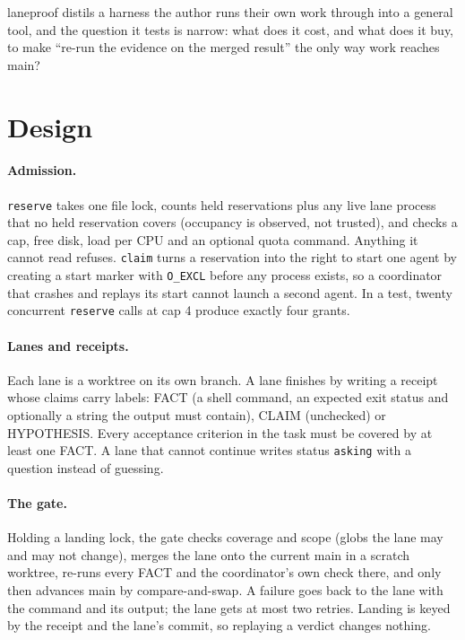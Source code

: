 \documentclass[11pt]{article}
\begin{document}
laneproof distils a harness the author runs their own work through into a general tool, and the question it tests is
narrow: what does it cost, and what does it buy, to make ``re-run the evidence on the merged result'' the only way
work reaches main?

\section{Design}
\paragraph{Admission.} \texttt{reserve} takes one file lock, counts held reservations plus any live lane process that
no held reservation covers (occupancy is observed, not trusted), and checks a cap, free disk, load per CPU and an
optional quota command. Anything it cannot read refuses. \texttt{claim} turns a reservation into the right to start
one agent by creating a start marker with \texttt{O\_EXCL} before any process exists, so a coordinator that crashes
and replays its start cannot launch a second agent. In a test, twenty concurrent \texttt{reserve} calls at cap 4
produce exactly four grants.

\paragraph{Lanes and receipts.} Each lane is a worktree on its own branch. A lane finishes by writing a receipt whose
claims carry labels: FACT (a shell command, an expected exit status and optionally a string the output must contain),
CLAIM (unchecked) or HYPOTHESIS. Every acceptance criterion in the task must be covered by at least one FACT. A lane
that cannot continue writes status \texttt{asking} with a question instead of guessing.

\paragraph{The gate.} Holding a landing lock, the gate checks coverage and scope (globs the lane may and may not
change), merges the lane onto the current main in a scratch worktree, re-runs every FACT and the coordinator's own
check there, and only then advances main by compare-and-swap. A failure goes back to the lane with the command and
its output; the lane gets at most two retries. Landing is keyed by the receipt and the lane's commit, so replaying a
verdict changes nothing.
\end{document}
